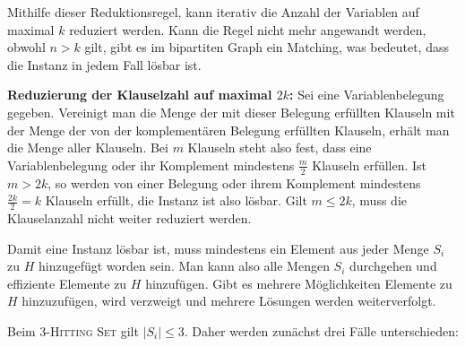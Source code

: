 Mithilfe dieser Reduktionsregel, kann iterativ die Anzahl der Variablen auf maximal $k$ reduziert werden. Kann die Regel nicht mehr angewandt werden, obwohl $n>k$ gilt, gibt es im bipartiten Graph ein Matching, was bedeutet, dass die Instanz in jedem Fall lösbar ist.

\textbf{Reduzierung der Klauselzahl auf maximal $2k$:} Sei eine Variablenbelegung gegeben. Vereinigt man die Menge der mit dieser Belegung erfüllten Klauseln mit der Menge der von der komplementären Belegung erfüllten Klauseln, erhält man die Menge aller Klauseln. Bei $m$ Klauseln steht also fest, dass eine Variablenbelegung oder ihr Komplement mindestens $\frac{m}{2}$ Klauseln erfüllen. Ist $m > 2k$, so werden von einer Belegung oder ihrem Komplement mindestens $\frac{2k}{2}=k$ Klauseln erfüllt, die Instanz ist also lösbar. Gilt $m \leq 2k$, muss die Klauselanzahl nicht weiter reduziert werden.

\subexercise



Damit eine Instanz lösbar ist, muss mindestens ein Element aus jeder Menge $S_i$ zu $H$ hinzugefügt worden sein. Man kann also alle Mengen $S_i$ durchgehen und effiziente Elemente zu $H$ hinzufügen. Gibt es mehrere Möglichkeiten Elemente zu $H$ hinzuzufügen, wird verzweigt und mehrere Lösungen werden weiterverfolgt. 

Beim \textsc{3-Hitting Set} gilt $|S_i| \leq 3$. Daher werden zunächst drei Fälle unterschieden:

